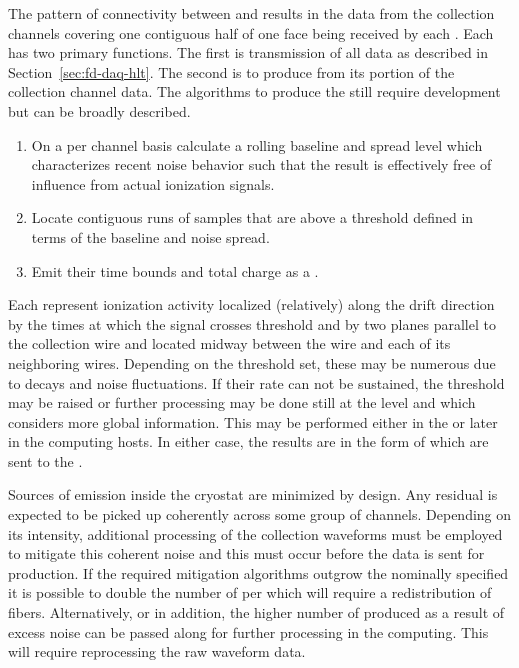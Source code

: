 The pattern of connectivity between  and  results in the data
from the collection channels covering one contiguous half of one 
face being received by each .
Each  has two primary functions. 
The first is transmission of all data as described in
Section~\ref{sec:fd-daq-hlt}. 
The second is to produce  from its portion of the
collection channel data.
The algorithms to produce the  still require
development but can be broadly described.   

\begin{enumerate}
\item On a per channel basis calculate a rolling baseline and spread
  level which characterizes recent noise behavior such that the result
  is effectively free of influence from actual ionization signals.
\item Locate contiguous runs of  samples that are above a threshold
  defined in terms of the baseline and noise spread.
\item Emit their time bounds and total charge as a .
\end{enumerate}

Each  represent ionization activity localized
(relatively) along the drift direction by the times at which the
signal crosses threshold and by two planes parallel to the collection
wire and located midway between the wire and each of its neighboring
wires.
Depending on the threshold set, these  may be
numerous due to  decays and noise fluctuations.
If their rate can not be sustained, the threshold may be raised or
further processing may be done still at the  level and which
considers more global information.
This may be performed either in the  or later in the
 computing hosts. 
In either case, the results are in the form of 
which are sent to the .

Sources of  emission inside the cryostat are minimized by
design. 
Any residual  is expected to be picked up coherently across
some group of channels. 
Depending on its intensity, additional processing of the collection
waveforms must be employed to mitigate this coherent noise and this
must occur before the data is sent for 
production. 
If the required mitigation algorithms outgrow the nominally specified
  it is possible to double the number of
 per  which will require a redistribution of fibers. 
Alternatively, or in addition, the higher number of
 produced as a result of excess noise can be
passed along for further processing in the  computing. 
This will require reprocessing the raw waveform data.

